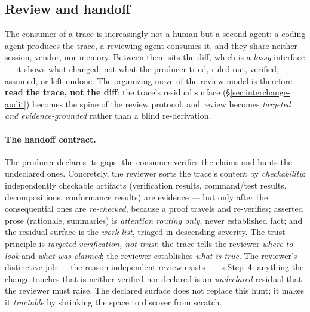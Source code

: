 \subsection{Review and handoff}\label{sec:interchange-review}

The consumer of a trace is increasingly not a human but a second agent: a coding agent produces the trace, a
reviewing agent consumes it, and they share neither session, vendor, nor memory. Between them sits the diff,
which is a \emph{lossy} interface --- it shows what changed, not what the producer tried, ruled out, verified,
assumed, or left undone. The organizing move of the review model is therefore \textbf{read the trace, not the
diff}: the trace's residual surface (\S\ref{sec:interchange-audit}) becomes the spine of the review protocol,
and review becomes \emph{targeted and evidence-grounded} rather than a blind re-derivation.

\paragraph{The handoff contract.} The producer declares its gaps; the consumer verifies the claims and hunts
the undeclared ones. Concretely, the reviewer sorts the trace's content by \emph{checkability}: independently
checkable artifacts (verification results, command/test results, decompositions, conformance results) are
evidence --- but only after the consequential ones are \emph{re-checked}, because a proof travels and
re-verifies; asserted prose (rationale, summaries) is \emph{attention routing only}, never established fact;
and the residual surface is the \emph{work-list}, triaged in descending severity. The trust principle is
\emph{targeted verification, not trust}: the trace tells the reviewer \emph{where to look} and \emph{what was
claimed}; the reviewer establishes \emph{what is true}. The reviewer's distinctive job --- the reason
independent review exists --- is Step~4: anything the change touches that is neither verified nor declared is
an \emph{undeclared} residual that the reviewer must raise. The declared surface does not replace this hunt;
it makes it \emph{tractable} by shrinking the space to discover from scratch.

